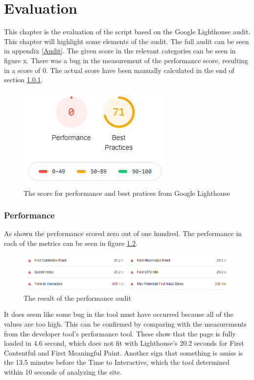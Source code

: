 \chapter{Evaluation}\label{Eval}
This chapter is the evaluation of the script based on the Google Lighthouse audit. This chapter will highlight some elements of the audit. The full audit can be seen in appendix \ref{Audit}. The given score in the relevant categories can be seen in figure x. There was a bug in the measurement of the performance score, resulting in a score of 0. The actual score have been manually calculated in the end of section \ref{EvalPerform}. 

\begin{figure} [H]
	\centering
	\includegraphics[width=.4\textwidth]{Pictures/LighthouseGrade}
	\caption{The score for performance and best pratices from Google Lighthouse}
	\label{LighthouseGrade}
\end{figure}

\subsection{Performance}\label{EvalPerform}
As shown the performance scored zero out of one hundred. The performance in each of the metrics can be seen in figure \ref{PerformanceAuditValues}.

\begin{figure} [H]
	\centering
	\includegraphics[width=.8\textwidth]{Pictures/PerformanceAuditValues}
	\caption{The result of the performance audit}
	\label{PerformanceAuditValues}
\end{figure}

It does seem like some bug in the tool must have occurred because all of the values are too high. This can be confirmed by comparing with the measurements from the developer tool’s performance tool. These show that the page is fully loaded in 4.6 second, which does not fit with Lighthouse’s 20.2 seconds for First Contentful and First Meaningful Paint. Another sign that something is amiss is the 13.5 minutes before the Time to Interactive, which the tool determined within 10 seconds of analyzing the site. 

